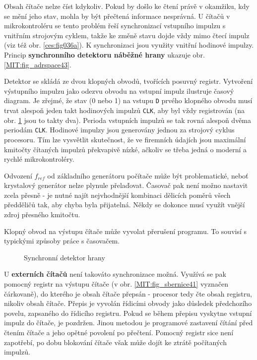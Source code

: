         Obsah čítače nelze číst kdykoliv. Pokud by došlo ke čtení právě v okamžiku, kdy se mění 
        jeho stav, mohla by být přečtená informace nesprávná. U čítačů v mikrokontroléru se tento 
        problém řeší synchronizací vstupního impulzu s vnitřním strojovým cyklem, takže ke změně 
        stavu dojde vždy mimo čtecí impulz (viz též obr. \ref{ces:fig036a}). K synchronizaci 
        jsou využity vnitřní hodinové impulzy. Princip \textbf{synchronního detektoru náběžné 
        hrany} ukazuje obr.\ref{MIT:fig_adrspace43}.
        
        Detektor se skládá ze dvou klopných obvodů, tvořících posuvný registr. Vytvoření výstupního 
        impulzu jako odezvu obvodu na vstupní impulz ilustruje časový diagram. Je zřejmé, že stav 
        (0 nebo 1) na vstupu \texttt{D} prvého klopného obvodu musí trvat alespoň jeden takt 
        hodinových impulzů \texttt{CLK}, aby byl vždy registrován (na obr. 
        \ref{MIT:fig_sbernice4243} jsou to takty dva). Perioda vstupních impulzů se tak rovná 
        alespoň dvěma periodám \texttt{CLK}. Hodinové impulzy jsou generovány jednou za strojový 
        cyklus procesoru. Tím lze vysvětlit skutečnost, že ve firemních údajích jsou maximální 
        kmitočty čítaných impulzů překvapivě nízké, ačkoliv se třeba jedná o moderní a rychlé 
        mikrokontroléry.
        
        Odvození \(f_{ref}\) od základního generátoru počítače může být problematické, neboť 
        krystalový generátor nelze plynule přelaďovat. Časovač pak není možno nastavit zcela přesně 
        - je nutné najít nejvhodnější kombinaci dělicích poměrů všech předděličů tak, aby chyba 
        byla přijatelná. Někdy se dokonce musí využít vnější zdroj přesného kmitočtu.
        
        Klopný obvod na výstupu čítače může vyvolat přerušení programu. To souvisí s typickými 
        způsoby práce s časovačem.

        \begin{figure}[ht!]
          \centering  
          \caption{Synchronní detektor hrany}
          \label{MIT:fig_sbernice4243}
        \end{figure}

        U \textbf{externích čítačů} není takováto synchronizace možná. Využívá se pak pomocný 
        registr na výstupu čítače (v obr. \ref{MIT:fig_sbernice41} vyznačen čárkovaně), do kterého 
        je obsah čítače přepsán - procesor tedy čte obsah registru, nikoliv obsah čítače. Přepis je 
        vyvolán řídicími obvody jako důsledek předchozího povelu, zapsaného do řídicího registru. 
        Pokud se během přepisu vyskytne vstupní impulz do čítače, je pozdržen. Jinou metodou je 
        programové zastavení čítání před čtením čítače a jeho opětné povolení po přečtení. Pomocný 
        registr sice není zapotřebí, po dobu blokování čítače však může dojít ke ztrátě počítaných 
        impulzů.
        
